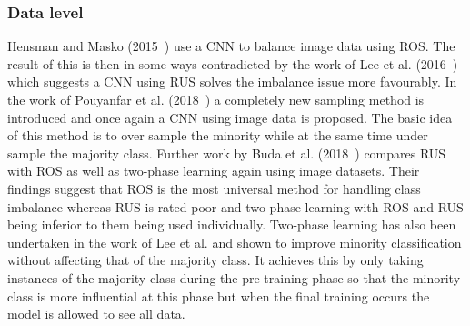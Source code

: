 \subsubsection{Data level}\label{subsec:DeepLearningDataLevel}
Hensman and Masko (2015~\cite{masko2015impact}) use a CNN to balance image data using ROS. The result of this is then in some ways contradicted by the work of Lee et al. (2016~\cite{lee2016plankton}) which suggests a CNN using RUS solves the imbalance issue more favourably. In the work of Pouyanfar et al. (2018~\cite{pouyanfar2018dynamic}) a completely new sampling method is introduced and once again a CNN using image data is proposed. The basic idea of this method is to over sample the minority while at the same time under sample the majority class. Further work by Buda et al. (2018~\cite{buda2018systematic}) compares RUS with ROS as well as two-phase learning again using image datasets. Their findings suggest that ROS is the most universal method for handling class imbalance whereas RUS is rated poor and two-phase learning with ROS and RUS being inferior to them being used individually. Two-phase learning has also been undertaken in the work of Lee et al. and shown to improve minority classification without affecting that of the majority class. It achieves this by only taking instances of the majority class during the pre-training phase so that the minority class is more influential at this phase but when the final training occurs the model is allowed to see all data.
\par
